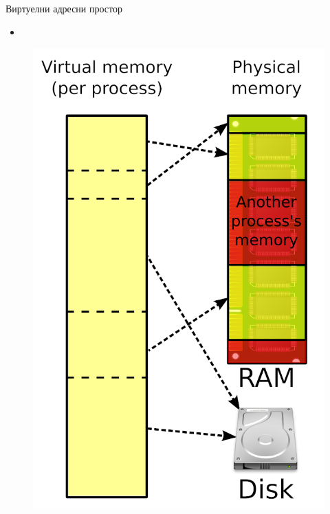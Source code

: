 \documentclass{beamer}
\begin{document}
    \begin{frame}[allowframebreaks]{Виртуелни адресни простор}
        \begin{itemize}
            \item
        \end{itemize}
        
        \framebreak
        
        \begin{figure}
            \centering
            \includegraphics[width=\textwidth,height=0.8\textheight,keepaspectratio]{images/virtmem.png}
            \label{fig:virtmem}
        \end{figure}
    \end{frame}
    
\end{document}
